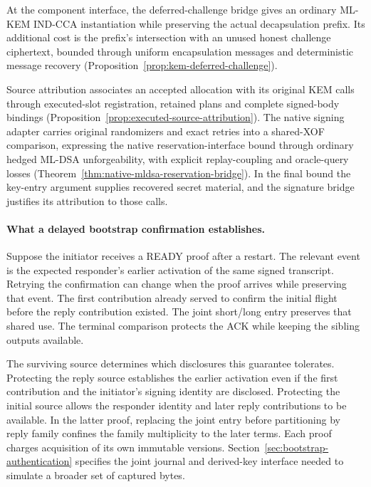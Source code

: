 At the component interface, the deferred-challenge bridge gives an
ordinary ML-KEM IND-CCA instantiation while preserving the actual
decapsulation prefix. Its additional cost is the prefix's intersection
with an unused honest challenge ciphertext, bounded through uniform
encapsulation messages and deterministic message recovery
(Proposition~\ref{prop:kem-deferred-challenge}).

Source attribution associates an accepted allocation with its original
KEM calls through executed-slot registration, retained plans and complete
signed-body bindings
(Proposition~\ref{prop:executed-source-attribution}). The native signing
adapter carries original randomizers and exact retries into a shared-XOF
comparison, expressing the native reservation-interface bound through
ordinary hedged ML-DSA unforgeability, with explicit replay-coupling and
oracle-query losses
(Theorem~\ref{thm:native-mldsa-reservation-bridge}). In the final bound the
key-entry argument supplies recovered secret material, and the
signature bridge justifies its attribution to those calls.

\paragraph{What a delayed bootstrap confirmation establishes.}
Suppose the initiator receives a READY proof after a restart. The
relevant event is the expected responder's earlier activation of the
same signed transcript. Retrying the confirmation can change when
the proof arrives while preserving that event. The first contribution
already served to confirm the initial flight before the reply
contribution existed. The joint short/long entry preserves that shared
use. The terminal comparison protects the ACK while keeping the
sibling outputs available.

The surviving source determines which disclosures this guarantee
tolerates. Protecting the reply source establishes the earlier
activation even if the first contribution and the initiator's signing
identity are disclosed. Protecting the initial source allows the
responder identity and later reply contributions to be available.
In the latter proof, replacing the joint entry before partitioning by
reply family confines the family multiplicity to the later terms.
Each proof charges acquisition of its own immutable versions.
Section~\ref{sec:bootstrap-authentication} specifies the joint journal
and derived-key interface needed to simulate a broader set of captured
bytes.

